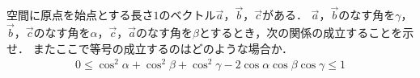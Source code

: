 \documentclass[../../main.tex]{subfiles}
\begin{document}
空間に原点を始点とする長さ$1$のベクトル$\vec{a}$，$\vec{b}$，$\vec{c}$がある．
$\vec{a}$，$\vec{b}$のなす角を$\gamma$，$\vec{b}$，$\vec{c}$のなす角を$\alpha$，$\vec{c}$，$\vec{a}$のなす角を$\beta$とするとき，次の関係の成立することを示せ．
またここで等号の成立するのはどのような場合か．
\begin{align*}
  0\le \cos^2\alpha+\cos^2\beta+\cos^2\gamma-2\cos\alpha \cos\beta \cos\gamma \le 1
\end{align*}
\end{document}
